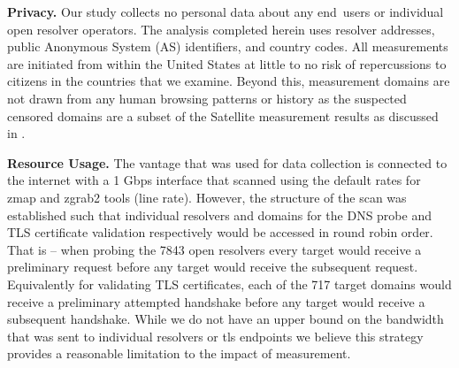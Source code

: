 \textbf{Privacy.}
Our study collects no personal data about any end~users
or individual open resolver operators. The analysis
completed herein uses resolver addresses, public Anonymous System (AS) identifiers,
and country codes.  All measurements are initiated from within the United
States at little to no risk of repercussions to citizens in the countries
that we examine. Beyond this, measurement domains are not drawn from any human
browsing patterns or history as the suspected censored domains are a subset of
the Satellite measurement results as discussed in .

\textbf{Resource Usage.}
The vantage that was used for data collection is connected to the internet with
a 1 Gbps interface that scanned using the default rates for zmap and zgrab2 tools
(line rate). However, the structure of the scan was established such that
individual resolvers and domains for the DNS probe and TLS certificate validation
respectively would be accessed in round robin order. That is -- when probing the
7843 open resolvers every target would receive a preliminary request before any
target would receive the subsequent request.  Equivalently for
validating TLS certificates, each of the 717 target domains would receive a preliminary
attempted handshake before any target would receive a subsequent handshake.
While we do not have an upper bound on the bandwidth that was sent to individual
resolvers or tls endpoints we believe this strategy provides a reasonable
limitation to the impact of measurement.